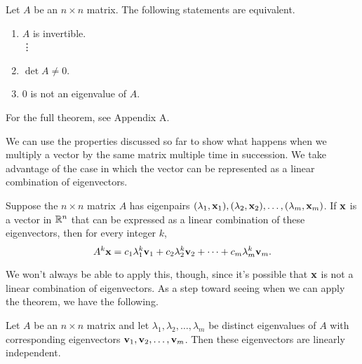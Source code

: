 \documentclass[../m073main.tex]{subfiles}
\begin{document}
\begin{theorem}
	Let $A$ be an $n \times n$ matrix.
	The following statements are equivalent.
	\begin{enumerate}[label=(\alph*)]
		\item $A$ is invertible. \\
		\phantom{~}\hspace{-19.5pt} \vdots
		\setcounter{enumi}{13}
		\item $\det A \neq 0$.
		\item 0 is not an eigenvalue of $A$.
	\end{enumerate}
	For the full theorem, see Appendix A.
\end{theorem}

We can use the properties discussed so far to show what happens when we multiply a vector by the same matrix multiple time in succession.
We take advantage of the case in which the vector can be represented as a linear combination of eigenvectors.

\begin{theorem}
	Suppose the $n \times n$ matrix $A$ has eigenpairs $(\lambda_1, \mathbf{x}_1), (\lambda_2, \mathbf{x}_2), \ldots, (\lambda_m, \mathbf{x}_m)$.
	If $\mathbf{x}$ is a vector in $\mathbb{R}^n$ that can be expressed as a linear combination of these eigenvectors, then for every integer $k$,
	\[ A^k \mathbf{x} = c_1 \lambda_1^k \mathbf{v}_1 + c_2 \lambda_2^k \mathbf{v}_2 + \cdots + c_m \lambda_m^k \mathbf{v}_m. \]
\end{theorem}

We won't always be able to apply this, though, since it's possible that $\mathbf{x}$ is not a linear combination of eigenvectors.
As a step toward seeing when we can apply the theorem, we have the following.

\begin{theorem}
	Let $A$ be an $n \times n$ matrix and let $\lambda_1, \lambda_2, \ldots, \lambda_m$ be distinct eigenvalues of $A$ with corresponding eigenvectors $\mathbf{v}_1, \mathbf{v}_2, \ldots, \mathbf{v}_m$.
	Then these eigenvectors are linearly independent.
\end{theorem}
\end{document}
